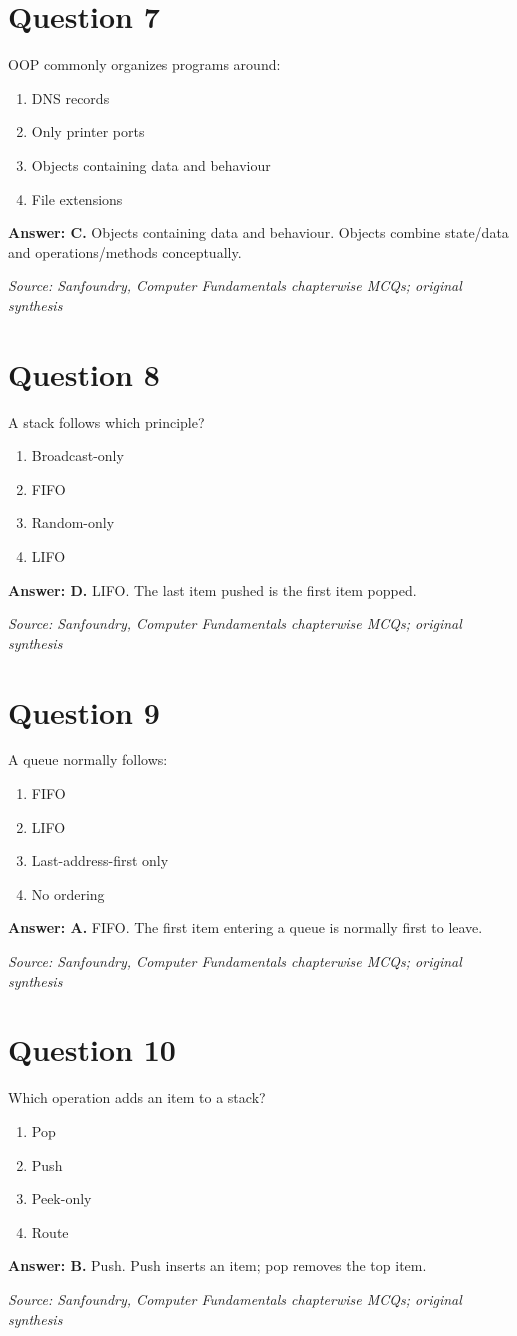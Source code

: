 \documentclass[11pt,a4paper]{book}
\newcommand{\source}[1]{\par\smallskip\textit{Source: #1}}
\newcommand{\answer}[2]{\par\textbf{Answer: #1.} #2}
\begin{document}
\section*{Question 7}
OOP commonly organizes programs around:
\begin{enumerate}[label=\Alph*.]
\item DNS records
\item Only printer ports
\item Objects containing data and behaviour
\item File extensions
\end{enumerate}
\answer{C}{Objects containing data and behaviour. Objects combine state/data and operations/methods conceptually.}
\source{Sanfoundry, Computer Fundamentals chapterwise MCQs; original synthesis}
\section*{Question 8}
A stack follows which principle?
\begin{enumerate}[label=\Alph*.]
\item Broadcast-only
\item FIFO
\item Random-only
\item LIFO
\end{enumerate}
\answer{D}{LIFO. The last item pushed is the first item popped.}
\source{Sanfoundry, Computer Fundamentals chapterwise MCQs; original synthesis}
\section*{Question 9}
A queue normally follows:
\begin{enumerate}[label=\Alph*.]
\item FIFO
\item LIFO
\item Last-address-first only
\item No ordering
\end{enumerate}
\answer{A}{FIFO. The first item entering a queue is normally first to leave.}
\source{Sanfoundry, Computer Fundamentals chapterwise MCQs; original synthesis}
\section*{Question 10}
Which operation adds an item to a stack?
\begin{enumerate}[label=\Alph*.]
\item Pop
\item Push
\item Peek-only
\item Route
\end{enumerate}
\answer{B}{Push. Push inserts an item; pop removes the top item.}
\source{Sanfoundry, Computer Fundamentals chapterwise MCQs; original synthesis}
\end{document}
